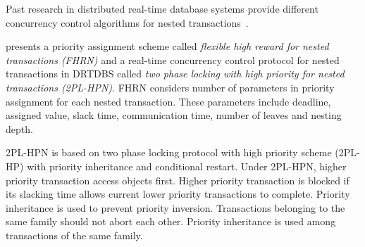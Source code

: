 \documentclass[letter]{sig-alternate}
\begin{document}
Past research in distributed real-time database systems provide different concurrency control algorithms for nested transactions~\cite{chen2002efficient,4709120,1420972,316159}. 
\begin{comment}
Nested transactions are represented as trees. The outermost transaction is the root of the tree. Children of the root are either sub-transactions or leaf nodes. Each sub-transaction itself consists of other sub-transactions and/or leaf nodes. Data can be accessed in leaf nodes and/or sub-transactions by ``read'' and ``write'' operations. Relation between children of any node is done by AND or OR operations. AND means all children of the node must commit for their parent to commit. OR means only one child should commit for its parent to commit. \cite{chen2002efficient,4709120,1420972} are concerned with closed nesting. A parent and child transactions execute asynchronously if they both can run concurrently. Otherwise,
if the parent stops to let the child run, then this is a synchronous mode. 
\end{comment}
%
\cite{chen2002efficient} presents a priority assignment scheme called \textit{flexible high reward for nested transactions (FHRN)} and a real-time concurrency control protocol for nested transactions in DRTDBS called \textit{two phase locking with high priority for nested
transactions (2PL-HPN)}. FHRN considers number of parameters in priority assignment for each nested transaction. These parameters include deadline, assigned value, slack time, communication time, number of leaves and nesting depth.
\begin{comment}
Under FHRN, a nested transaction can be aborted by any other transaction. So, FHRN cannot bound worst case upper bound on retry cost in real-time systems. 
\end{comment}
2PL-HPN is based on two phase locking protocol with high priority scheme (2PL-HP) \textbf{\cite{Abbott:1988:SRT:44203.44209}} with priority inheritance and conditional restart. Under 2PL-HPN, higher priority transaction access objects first. Higher priority transaction is blocked if its slacking time allows current lower priority transactions to complete. Priority inheritance is used to prevent priority inversion. Transactions belonging to the same family should not abort each other. Priority inheritance is used among transactions of the same family.
\end{document}
